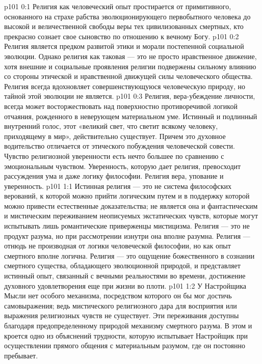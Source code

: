 \author{Мелхиседек}
\vs p101 0:1 Религия как человеческий опыт простирается от примитивного, основанного на страхе рабства эволюционирующего первобытного человека до высокой и величественной свободы веры тех цивилизованных смертных, кто прекрасно сознает свое сыновство по отношению к вечному Богу.
\vs p101 0:2 Религия является предком развитой этики и морали постепенной социальной эволюции. Однако религия как таковая --- это не просто нравственное движение, хотя внешние и социальные проявления религии подвержены сильному влиянию со стороны этической и нравственной движущей силы человеческого общества. Религия всегда вдохновляет совершенствующуюся человеческую природу, но тайной этой эволюции не является.
\vs p101 0:3 Религия, вера\hyp{}убеждение личности, всегда может восторжествовать над поверхностно противоречивой логикой отчаяния, рожденного в неверующем материальном уме. Истинный и подлинный внутренний голос, этот «великий свет, что светит всякому человеку, приходящему в мир», действительно существует. Причем это духовное водительство отличается от этического побуждения человеческой совести. Чувство религиозной уверенности есть нечто большее по сравнению с эмоциональным чувством. Уверенность, которую дает религия, превосходит рассуждения ума и даже логику философии. Религия  вера, упование и уверенность.
\vs p101 1:1 Истинная религия --- это не система философских верований, к которой можно прийти логическим путем и в поддержку которой можно привести естественные доказательства; не является она и фантастическим и мистическим переживанием неописуемых экстатических чувств, которые могут испытывать лишь романтические приверженцы мистицизма. Религия --- это не продукт разума, но при рассмотрении изнутри она вполне разумна. Религия --- отнюдь не производная от логики человеческой философии, но как опыт смертного вполне логична. Религия --- это ощущение божественного в сознании смертного существа, обладающего эволюционной природой, и представляет истинный опыт, связанный с вечными реальностями во времени, достижение духовного удовлетворения еще при жизни во плоти.
\vs p101 1:2 \pc У Настройщика Мысли нет особого механизма, посредством которого он бы мог достичь самовыражения; ведь мистического религиозного дара для восприятия или выражения религиозных чувств не существует. Эти переживания доступны благодаря предопределенному природой механизму смертного разума. В этом и кроется одно из объяснений трудности, которую испытывает Настройщик при осуществлении прямого общения с материальным разумом, где он постоянно пребывает.
